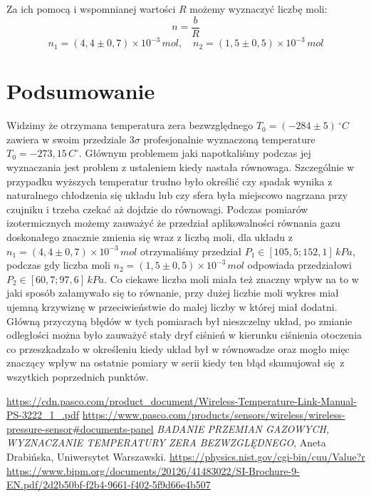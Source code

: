 \documentclass[12pt]{article}
\begin{document}
Za ich pomocą i wspomnianej wartości \(R\) możemy wyznaczyć liczbę moli:
\[
    n = \frac{b}{R}
\]
\[
    n_1 = (4{,}4 \pm 0{,}7) \times 10^{-3} \, mol ,\quad n_2 = (1{,}5 \pm 0{,}5) \times 10^{-3} \, mol
\]

\newpage

\section{Podsumowanie}
Widzimy że otrzymana temperatura zera bezwzględnego \(T_0 = (-284 \pm 5) \, ^\circ C\) zawiera w swoim przedziale \(3 \sigma\) profesjonalnie wyznaczoną temperature\cite{temperature} \(T_0 = -273{,}15\,C^\circ\). Głównym problemem jaki napotkaliśmy podczas jej wyznaczania jest problem z ustaleniem kiedy nastała równowaga. Szczególnie w przypadku wyższych temperatur trudno było określić czy spadak wynika z naturalnego chłodzenia się układu lub czy sfera była miejscowo nagrzana przy czujniku i trzeba czekać aż dojdzie do równowagi. Podczas pomiarów izotermicznych możemy zauważyć że przedział aplikowalności równania gazu doskonałego znacznie zmienia się wraz z liczbą moli, dla układu z \(n_1 = (4{,}4 \pm 0{,}7) \times 10^{-3} \, mol\) otrzymaliśmy przedział \(P_1 \in [105{,}5; 152{,}1] \, kPa\), podczas gdy liczba moli \(n_2 = (1{,}5 \pm 0{,}5) \times 10^{-3} \, mol\) odpowiada przedziałowi \(P_2 \in [60{,}7; 97{,}6] \, kPa\). Co ciekawe liczba moli miała też znaczny wpływ na to w jaki sposób załamywało się to równanie, przy dużej liczbie moli wykres miał ujemną krzywiznę w przeciwieństwie do małej liczby w której miał dodatni. Główną przyczyną błędów w tych pomiarach był nieszczelny układ, po zmianie odległości można było zauważyć stały dryf ciśnień w kierunku ciśnienia otoczenia co przeszkadzało w określeniu kiedy układ był w równowadze oraz mogło mięc znaczący wpływ na ostatnie pomiary w serii kiedy ten błąd skumujował się z wszytkich poprzednich punktów.

\begin{thebibliography}{5}

    \url{https://cdn.pasco.com/product_document/Wireless-Temperature-Link-Manual-PS-3222_1_.pdf}
    \url{https://www.pasco.com/products/sensors/wireless/wireless-pressure-sensor#documents-panel}
	\emph{BADANIE PRZEMIAN GAZOWYCH, WYZNACZANIE TEMPERATURY ZERA BEZWZGLĘDNEGO}, Aneta Drabińska, Uniwersytet Warszawski.
    \url{https://physics.nist.gov/cgi-bin/cuu/Value?r}
    \url{https://www.bipm.org/documents/20126/41483022/SI-Brochure-9-EN.pdf/2d2b50bf-f2b4-9661-f402-5f9d66e4b507}

\end{thebibliography}
\end{document}

